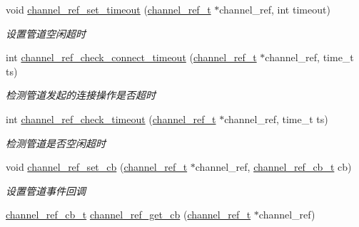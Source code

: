 \begin{DoxyCompactItemize}
void \hyperlink{a00084_ga4e46196f7ac40bdd14a1407167e88b7b_ga4e46196f7ac40bdd14a1407167e88b7b}{channel\+\_\+ref\+\_\+set\+\_\+timeout} (\hyperlink{a00044_a151271c9d188ef28d4d24bb81dcc1263_a151271c9d188ef28d4d24bb81dcc1263}{channel\+\_\+ref\+\_\+t} $\ast$channel\+\_\+ref, int timeout)
\begin{DoxyCompactList}\small\item\em 设置管道空闲超时 \end{DoxyCompactList}\item 
int \hyperlink{a00041_a1f03dc2b266c99aa3189dbe02564be45_a1f03dc2b266c99aa3189dbe02564be45}{channel\+\_\+ref\+\_\+check\+\_\+connect\+\_\+timeout} (\hyperlink{a00044_a151271c9d188ef28d4d24bb81dcc1263_a151271c9d188ef28d4d24bb81dcc1263}{channel\+\_\+ref\+\_\+t} $\ast$channel\+\_\+ref, time\+\_\+t ts)
\begin{DoxyCompactList}\small\item\em 检测管道发起的连接操作是否超时 \end{DoxyCompactList}\item 
int \hyperlink{a00041_ae0c46cab3e683bce5f93d07847db7ec1_ae0c46cab3e683bce5f93d07847db7ec1}{channel\+\_\+ref\+\_\+check\+\_\+timeout} (\hyperlink{a00044_a151271c9d188ef28d4d24bb81dcc1263_a151271c9d188ef28d4d24bb81dcc1263}{channel\+\_\+ref\+\_\+t} $\ast$channel\+\_\+ref, time\+\_\+t ts)
\begin{DoxyCompactList}\small\item\em 检测管道是否空闲超时 \end{DoxyCompactList}\item 
void \hyperlink{a00084_ga7627dbcdb87269ef2fae5bcbbb210720_ga7627dbcdb87269ef2fae5bcbbb210720}{channel\+\_\+ref\+\_\+set\+\_\+cb} (\hyperlink{a00044_a151271c9d188ef28d4d24bb81dcc1263_a151271c9d188ef28d4d24bb81dcc1263}{channel\+\_\+ref\+\_\+t} $\ast$channel\+\_\+ref, \hyperlink{a00044_ae296ec4d1ce108960de8dcc423956a1d_ae296ec4d1ce108960de8dcc423956a1d}{channel\+\_\+ref\+\_\+cb\+\_\+t} cb)
\begin{DoxyCompactList}\small\item\em 设置管道事件回调 \end{DoxyCompactList}\item 
\hyperlink{a00044_ae296ec4d1ce108960de8dcc423956a1d_ae296ec4d1ce108960de8dcc423956a1d}{channel\+\_\+ref\+\_\+cb\+\_\+t} \hyperlink{a00041_a1495c5893bdd3bf7508c0d13c7a591a6_a1495c5893bdd3bf7508c0d13c7a591a6}{channel\+\_\+ref\+\_\+get\+\_\+cb} (\hyperlink{a00044_a151271c9d188ef28d4d24bb81dcc1263_a151271c9d188ef28d4d24bb81dcc1263}{channel\+\_\+ref\+\_\+t} $\ast$channel\+\_\+ref)

\end{DoxyCompactItemize}

